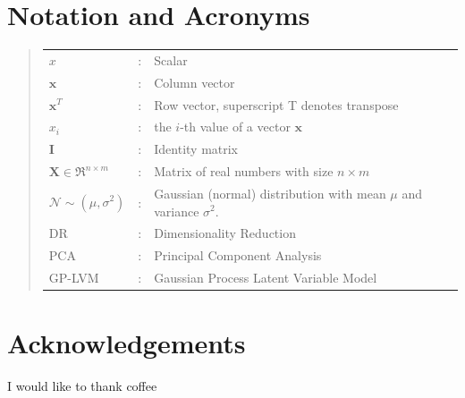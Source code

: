 \documentclass[ %
author={Dillon Keith Diep},
supervisor={Dr. Carl Henrik Ek},
degree={MEng},
title={ART-CG:},
subtitle={Assisted Real-time Content Generation of 3D Hair by Learning Manifolds},
type={Research},
year={2017} ]{dissertation}
\begin{document}

\chapter*{Notation and Acronyms}

\begin{quote}
	\noindent
	\begin{tabular}{lcl}
		$x$                 &:	& Scalar\\
		$\bm{x}$            &:	& Column vector\\
		$\bm{x}^T$			&:	& Row vector, superscript T denotes transpose\\
		$x_i$               &:  & the $i$-th value of a vector $\bm{x}$\\
		$\bm{I}$ 			&:	& Identity matrix\\
		$\bm{X}\in \Re^{n \times m}$	&:	& Matrix of real numbers with size $n \times m$\\
		$\mathcal{N}\sim(\mu, \sigma^2)$ 			&:	& Gaussian (normal) distribution with mean $\mu$ and variance $\sigma^2$.\\
		DR					&:	& Dimensionality Reduction\\
		PCA		 			&:	& Principal Component Analysis\\
		GP-LVM	 			&:	& Gaussian Process Latent Variable Model\\
	\end{tabular}
\end{quote}


\chapter*{Acknowledgements}
I would like to thank coffee


%
\end{document}
